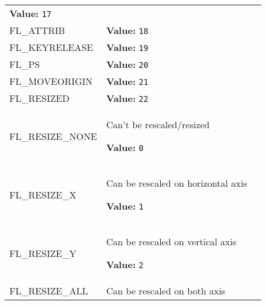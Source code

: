 \begin{longtable}{|p{\varnamewidth}|p{\vardescrwidth}|l}
\textbf{Value:} 
{\tt 17}&\\
\cline{1-2}
\raggedright F\-L\-\_\-A\-T\-T\-R\-I\-B\- & \raggedright \textbf{Value:} 
{\tt 18}&\\
\cline{1-2}
\raggedright F\-L\-\_\-K\-E\-Y\-R\-E\-L\-E\-A\-S\-E\- & \raggedright \textbf{Value:} 
{\tt 19}&\\
\cline{1-2}
\raggedright F\-L\-\_\-P\-S\- & \raggedright \textbf{Value:} 
{\tt 20}&\\
\cline{1-2}
\raggedright F\-L\-\_\-M\-O\-V\-E\-O\-R\-I\-G\-I\-N\- & \raggedright \textbf{Value:} 
{\tt 21}&\\
\cline{1-2}
\raggedright F\-L\-\_\-R\-E\-S\-I\-Z\-E\-D\- & \raggedright \textbf{Value:} 
{\tt 22}&\\
\cline{1-2}
\raggedright F\-L\-\_\-R\-E\-S\-I\-Z\-E\-\_\-N\-O\-N\-E\- & \raggedright Can't be rescaled/resized

\textbf{Value:} 
{\tt 0}&\\
\cline{1-2}
\raggedright F\-L\-\_\-R\-E\-S\-I\-Z\-E\-\_\-X\- & \raggedright Can be rescaled on horizontal axis

\textbf{Value:} 
{\tt 1}&\\
\cline{1-2}
\raggedright F\-L\-\_\-R\-E\-S\-I\-Z\-E\-\_\-Y\- & \raggedright Can be rescaled on vertical axis

\textbf{Value:} 
{\tt 2}&\\
\cline{1-2}
\raggedright F\-L\-\_\-R\-E\-S\-I\-Z\-E\-\_\-A\-L\-L\- & \raggedright Can be rescaled on both axis


\end{longtable}
